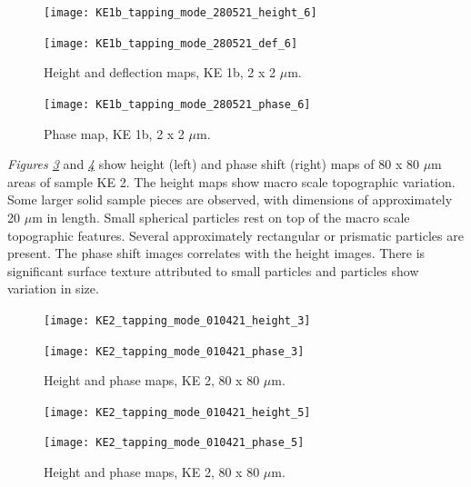 \begin{figure}[H]
\centering
\begin{minipage}{.45\textwidth}
  \centering
  \texttt{[image: KE1b\_tapping\_mode\_280521\_height\_6]}
\end{minipage}
\begin{minipage}{.45\textwidth}
  \centering
  \texttt{[image: KE1b\_tapping\_mode\_280521\_def\_6]}
\end{minipage}
\caption[Height and deflection maps, KE 1b]{Height and deflection maps, KE 1b, 2 x 2 $\mu$m.}
\label{fig:afm_ke1b_height_def_6}
\end{figure}

\begin{figure}[H]
\centering
  \texttt{[image: KE1b\_tapping\_mode\_280521\_phase\_6]}
\caption[Phase map, KE 1b]{Phase map, KE 1b, 2 x 2 $\mu$m.}
\label{fig:afm_ke1b_phase_6}
\end{figure}



\textit{Figures \ref{fig:afm_ke2_height_phase_1}} and \textit{\ref{fig:afm_ke2_height_phase_2}} show height (left) and phase shift (right) maps of 80 x 80 $\mu$m areas of sample KE 2. The height maps show macro scale topographic variation. Some larger solid sample pieces are observed, with dimensions of approximately 20 $\mu$m in length. Small spherical particles rest on top of the macro scale topographic features. Several approximately rectangular or prismatic particles are present. The phase shift images correlates with the height images. There is significant surface texture attributed to small particles and particles show variation in size.

\begin{figure}[H]
\centering
\begin{minipage}{.45\textwidth}
  \centering
  \texttt{[image: KE2\_tapping\_mode\_010421\_height\_3]}
\end{minipage}
\begin{minipage}{.45\textwidth}
  \centering
  \texttt{[image: KE2\_tapping\_mode\_010421\_phase\_3]}
\end{minipage}
\caption[Height and phase maps, KE 2]{Height and phase maps, KE 2, 80 x 80 $\mu$m.}
\label{fig:afm_ke2_height_phase_1}
\end{figure}


\begin{figure}[H]
\centering
\begin{minipage}{.45\textwidth}
  \centering
  \texttt{[image: KE2\_tapping\_mode\_010421\_height\_5]}
\end{minipage}
\begin{minipage}{.45\textwidth}
  \centering
  \texttt{[image: KE2\_tapping\_mode\_010421\_phase\_5]}
\end{minipage}
\caption[Height and phase maps, KE 2]{Height and phase maps, KE 2, 80 x 80 $\mu$m.}
\label{fig:afm_ke2_height_phase_2}
\end{figure}

